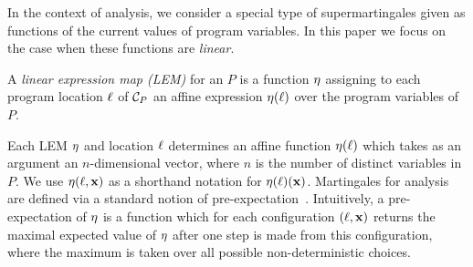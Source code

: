 
\smallskip{}
In the context of \APP{} analysis, we consider a special type of 
supermartingales given as functions of the current values of program variables. 
In this paper we focus on the case when these functions are \emph{linear}.

\smallskip
\begin{definition}
A \emph{linear expression map (LEM)} for an \APP{} $P$ is a function $\eta$ 
assigning to each program location $\ell$ of $\mathcal{C}_P$ an affine expression 
$\eta(\ell)$ over the program variables of $P$.
\end{definition}

Each LEM $\eta$ and location $\ell$ determines an affine function $\eta(\ell)$ 
which takes as an argument an $n$-dimensional vector, where $n$ is the number 
of distinct variables in $P$. We use $\eta(\ell,\mathbf{x})$ as a shorthand 
notation for $\eta(\ell)(\mathbf{x})$. 
Martingales for \APP{} analysis are defined via a standard notion of 
pre-expectation~\cite{SriramCAV}. Intuitively, a pre-expectation of $\eta$ is a 
function which for each configuration $(\ell,\mathbf{x})$ returns the maximal
expected value of $\eta$ after one step is made from this configuration, where 
the maximum is taken over all possible non-deterministic choices.

